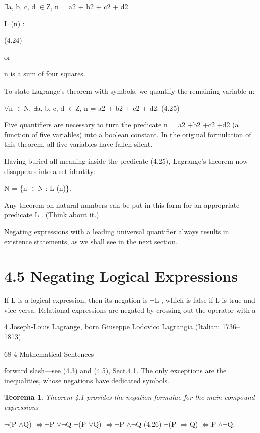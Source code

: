 \documentclass[11pt]{article}
\theoremstyle{plain}
\newtheorem{theorem}{Teorema}[section]
\theoremstyle{definition}
\begin{document}
$\exists$a, b, c, d $\in$Z, n = a2 + b2 + c2 + d2

L (n) :=

(4.24)

or

n is a sum of four squares.

To state Lagrange's theorem with symbols, we quantify the remaining variable n:

$\forall$n $\in$N, $\exists$a, b, c, d $\in$Z, n = a2 + b2 + c2 + d2. (4.25)

Five quantifiers are necessary to turn the predicate n = a2 +b2 +c2 +d2 (a function of five variables) into a boolean constant. In the original formulation of this theorem, all five variables have fallen silent.

Having buried all meaning inside the predicate (4.25), Lagrange's theorem now disappears into a set identity:

N = \{n $\in$N : L (n)\}.

Any theorem on natural numbers can be put in this form for an appropriate predicate L . (Think about it.)

Negating expressions with a leading universal quantifier always results in existence statements, as we shall see in the next section.

\section{4.5 Negating Logical Expressions}

If L is a logical expression, then its negation is $\neg$L , which is false if L is true and vice-versa. Relational expressions are negated by crossing out the operator with a

4 Joseph-Louis Lagrange, born Giuseppe Lodovico Lagrangia (Italian: 1736--1813).

68 4 Mathematical Sentences

forward slash---see (4.3) and (4.5), Sect.4.1. The only exceptions are the inequalities, whose negations have dedicated symbols. 

\begin{theorem}
Theorem 4.1 provides the negation formulae for the main compound expressions
\end{theorem}

$\neg$(P $\land$Q) $\Leftrightarrow$$\neg$P $\lor$$\neg$Q $\neg$(P $\lor$Q) $\Leftrightarrow$$\neg$P $\land$$\neg$Q (4.26) $\neg$(P $\Rightarrow$Q) $\Leftrightarrow$P $\land$$\neg$Q.
\end{document}
